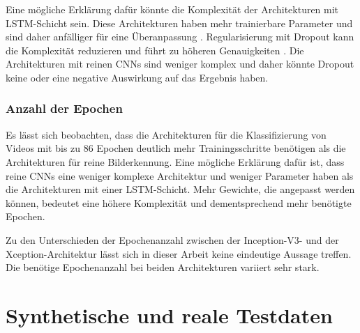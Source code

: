 Eine mögliche Erklärung dafür könnte die Komplexität der Architekturen mit \ac{LSTM}-Schicht sein. Diese Architekturen haben mehr trainierbare Parameter und sind daher anfälliger für eine Überanpassung \cite{hinton2012improving}. Regularisierung mit Dropout kann die Komplexität reduzieren und führt zu höheren Genauigkeiten \cite{hinton2012improving}. Die Architekturen mit reinen \acp{CNN} sind weniger komplex und daher könnte Dropout keine oder eine negative Auswirkung auf das Ergebnis haben.

\subsubsection{Anzahl der Epochen}

Es lässt sich beobachten, dass die Architekturen für die Klassifizierung von Videos mit bis zu 86 Epochen deutlich mehr Trainingsschritte benötigen als die Architekturen für reine Bilderkennung. Eine mögliche Erklärung dafür ist, dass reine \acp{CNN} eine weniger komplexe Architektur und weniger Parameter haben als die Architekturen mit einer \ac{LSTM}-Schicht. Mehr Gewichte, die angepasst werden können, bedeutet eine höhere Komplexität und dementsprechend mehr benötigte Epochen.

Zu den Unterschieden der Epochenanzahl zwischen der Inception-V3- und der Xception-Architektur lässt sich in dieser Arbeit keine eindeutige Aussage treffen. Die benötige Epochenanzahl bei beiden Architekturen variiert sehr stark.

\section{Synthetische und reale Testdaten}
\label{ergebnis_synth_vs_real}

